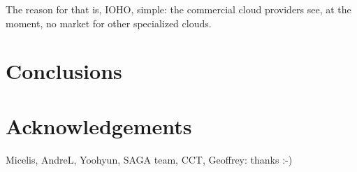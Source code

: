 \documentclass{article}
\begin{document}
  The reason for that is, IOHO, simple: the commercial cloud
  providers see, at the moment, no market for other specialized
  clouds.  




  
  
 


\section{Conclusions}
\label{sec:conclusion}

\section{Acknowledgements}
\label{sec:acks}

Micelis, AndreL, Yoohyun, SAGA team, CCT, Geoffrey: thanks :-)



\end{document}
